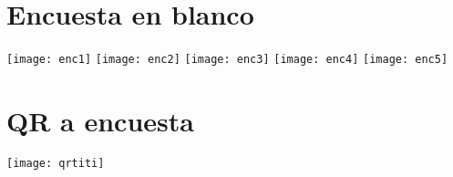 \section{Encuesta en blanco}
\centering
\texttt{[image: enc1]}
\texttt{[image: enc2]}
\texttt{[image: enc3]}
\texttt{[image: enc4]}
\texttt{[image: enc5]}
\section{QR a encuesta}
\centering
\texttt{[image: qrtiti]}